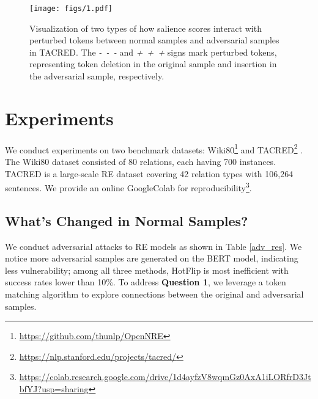 \documentclass[sigconf]{acmart}
\begin{document}
\begin{figure*}[h] \centering
  \texttt{[image: figs/1.pdf]}
\caption{Visualization of two types of how salience scores interact with perturbed tokens between normal samples and adversarial samples in TACRED.
The \emph{-\ -\ -} and \emph{+\ +\ +} signs mark perturbed tokens, representing token deletion in the original sample and insertion in the adversarial sample, respectively.}
\label{case1}
\end{figure*}
\section{Experiments}

We conduct experiments on two benchmark datasets: Wiki80\footnote{\url{https://github.com/thunlp/OpenNRE}} \cite{DBLP:conf/emnlp/HanZYWYLS18} and TACRED\footnote{\url{https://nlp.stanford.edu/projects/tacred/}} \cite{DBLP:conf/emnlp/ZhangZCAM17}. 
The Wiki80 dataset consisted of 80 relations, each having 700 instances. TACRED  is a large-scale RE dataset covering 42 relation types with 106,264 sentences. We provide an online GoogleColab for reproducibility\footnote{\url{https://colab.research.google.com/drive/1d4ayfzV8wqmGz0AxA1iLORfrD3JtbfYJ?usp=sharing}}.

\subsection{What's Changed in Normal Samples?}
\label{sec1}
We conduct adversarial attacks to RE models as shown in Table \ref{adv_res}. We notice more adversarial samples are generated on the BERT model, indicating less vulnerability; among all three methods, HotFlip is most inefficient with success rates lower than 10\%.
To address \textbf{Question 1}, we leverage a token matching algorithm  to explore connections between the original and adversarial samples.
\end{document}

